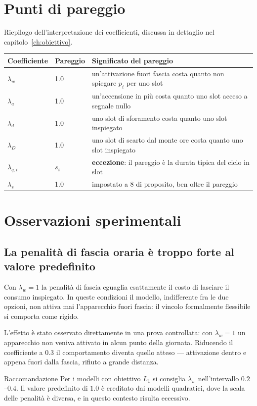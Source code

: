 \section{Punti di pareggio}

Riepilogo dell'interpretazione dei coefficienti, discussa in dettaglio nel
capitolo~\ref{ch:obiettivo}.

\begin{center}
\begin{tabularx}{\textwidth}{@{}l l X@{}}
\toprule
\textbf{Coefficiente} & \textbf{Pareggio} & \textbf{Significato del pareggio} \\
\midrule
$\lambda_w$ & 1.0 & un'attivazione fuori fascia costa quanto non spiegare $p_i$ per uno slot \\
$\lambda_a$ & 1.0 & un'accensione in più costa quanto uno slot acceso a segnale nullo \\
$\lambda_d$ & 1.0 & uno slot di sforamento costa quanto uno slot inspiegato \\
$\lambda_D$ & 1.0 & uno slot di scarto dal monte ore costa quanto uno slot inspiegato \\
$\lambda_{q,i}$ & $s_i$ & \textbf{eccezione}: il pareggio è la durata tipica del ciclo in slot \\
$\lambda_s$ & 1.0 & impostato a 8 di proposito, ben oltre il pareggio \\
\bottomrule
\end{tabularx}
\end{center}

\section{Osservazioni sperimentali}

\subsection{La penalità di fascia oraria è troppo forte al valore predefinito}

Con $\lambda_w = 1$ la penalità di fascia eguaglia esattamente il costo di lasciare il consumo
inspiegato. In queste condizioni il modello, indifferente fra le due opzioni, non attiva mai
l'apparecchio fuori fascia: il vincolo formalmente flessibile si comporta come rigido.

L'effetto è stato osservato direttamente in una prova controllata: con $\lambda_w = 1$ un
apparecchio non veniva attivato in alcun punto della giornata. Riducendo il coefficiente a $0.3$ il
comportamento diventa quello atteso --- attivazione dentro e appena fuori dalla fascia, rifiuto a
grande distanza.

\begin{notebox}{Raccomandazione}
Per i modelli con obiettivo $L_1$ si consiglia $\lambda_w$ nell'intervallo $0.2$--$0.4$. Il valore
predefinito di $1.0$ è ereditato dai modelli quadratici, dove la scala delle penalità è diversa, e
in questo contesto risulta eccessivo.
\end{notebox}
